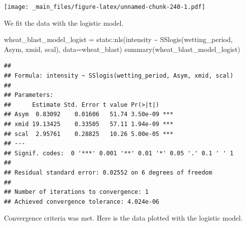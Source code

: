 \documentclass[
]{book}
\newenvironment{Shaded}{\begin{snugshade}}{\end{snugshade}}
\newcommand{\AttributeTok}[1]{\textcolor[rgb]{0.77,0.63,0.00}{#1}}
\newcommand{\DecValTok}[1]{\textcolor[rgb]{0.00,0.00,0.81}{#1}}
\newcommand{\FunctionTok}[1]{\textcolor[rgb]{0.00,0.00,0.00}{#1}}
\newcommand{\NormalTok}[1]{#1}
\newcommand{\OtherTok}[1]{\textcolor[rgb]{0.56,0.35,0.01}{#1}}
\newcommand{\SpecialCharTok}[1]{\textcolor[rgb]{0.00,0.00,0.00}{#1}}
\newcommand{\StringTok}[1]{\textcolor[rgb]{0.31,0.60,0.02}{#1}}
\begin{document}
\texttt{[image: \_main\_files/figure-latex/unnamed-chunk-240-1.pdf]}

We fit the data with the logistic model.

\begin{Shaded}
\begin{Highlighting}[]
\NormalTok{wheat\_blast\_model\_logist }\OtherTok{=}\NormalTok{ stats}\SpecialCharTok{::}\FunctionTok{nls}\NormalTok{(intensity }\SpecialCharTok{\textasciitilde{}} \FunctionTok{SSlogis}\NormalTok{(wetting\_period, Asym, xmid, scal), }\AttributeTok{data=}\NormalTok{wheat\_blast)}
\FunctionTok{summary}\NormalTok{(wheat\_blast\_model\_logist)}
\end{Highlighting}
\end{Shaded}

\begin{verbatim}
## 
## Formula: intensity ~ SSlogis(wetting_period, Asym, xmid, scal)
## 
## Parameters:
##      Estimate Std. Error t value Pr(>|t|)    
## Asym  0.83092    0.01606   51.74 3.50e-09 ***
## xmid 19.13425    0.33505   57.11 1.94e-09 ***
## scal  2.95761    0.28825   10.26 5.00e-05 ***
## ---
## Signif. codes:  0 '***' 0.001 '**' 0.01 '*' 0.05 '.' 0.1 ' ' 1
## 
## Residual standard error: 0.02552 on 6 degrees of freedom
## 
## Number of iterations to convergence: 1 
## Achieved convergence tolerance: 4.024e-06
\end{verbatim}

Convergence criteria was met. Here is the data plotted with the logistic model.

\begin{Shaded}
\end{Shaded}
\end{document}
